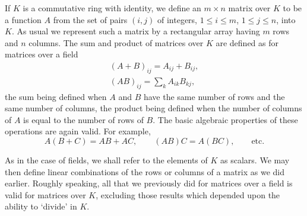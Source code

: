 If \(K\) is a commutative ring with identity, we define an \(m\times n\) matrix over \(K\) to be a function \(A\) from the set of pairs \(\left(i,j\right)\) of integers, \(1\leqslant i\leqslant m\), \(1\leqslant j\leqslant n\), into \(K\). As usual we represent such a matrix by a rectangular array having \(m\) rows and \(n\) columns. The sum and product of matrices over \(K\) are defined as for matrices over a field
\begin{align*}
    \left(A+B\right)_{ij}=A_{ij}+B_{ij},\\
    \left(AB\right)_{ij}=\sum_kA_{ik}B_{kj},
\end{align*}
the sum being defined when \(A\) and \(B\) have the same number of rows and the same number of columns, the product being defined when the number of columns of \(A\) is equal to the number of rows of \(B\). The basic algebraic properties of these operations are again valid. For example,
\begin{equation*}
    A\left(B+C\right)=AB+AC,\qquad\left(AB\right)C=A\left(BC\right),\qquad\text{etc.}
\end{equation*}

As in the case of fields, we shall refer to the elements of \(K\) as scalars. We may then define linear combinations of the rows or columns of a matrix as we did earlier. Roughly speaking, all that we previously did for matrices over a field is valid for matrices over \(K\), excluding those results which depended upon the ability to `divide' in \(K\).
